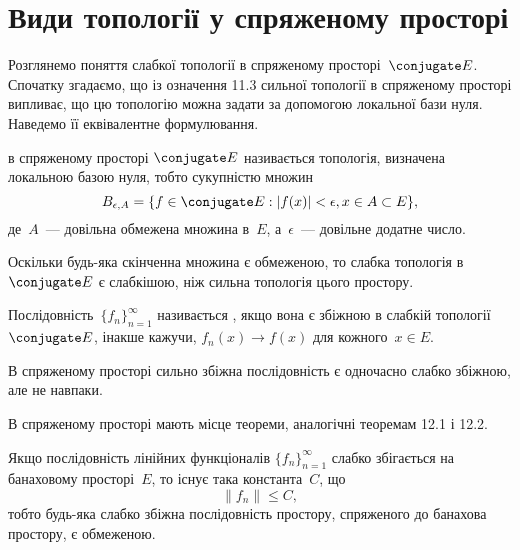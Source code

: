 \section{Види топології у спряженому просторі}

Розглянемо поняття слабкої топології в спряженому
просторі~$\conjugate E$. Спочатку згадаємо, що із означення 11.3 сильної
топології в спряженому просторі випливає, що цю топологію
можна задати за допомогою локальної бази нуля. Наведемо її
еквівалентне формулювання.

\begin{definition}
 в спряженому просторі
$\conjugate E$ називається топологія, визначена локальною базою нуля,
тобто сукупністю множин
\begin{equation*}
    B_{\epsilon, A} = \{ f \in \conjugate E: |f(x)| < \epsilon, x \in A \subset E\},
\end{equation*}
де~$A$~--- довільна обмежена множина в~$E$, а~$\epsilon$~--- довільне
додатне число.
\end{definition}

\begin{remark}
Оскільки будь-яка скінченна множина є
обмеженою, то слабка топологія в~$\conjugate E$ є слабкішою, ніж
сильна топологія цього простору.
\end{remark}

\begin{definition}
Послідовність~$\{f_n\}_{n = 1}^\infty$
називається ,
якщо вона є збіжною в слабкій топології~$\conjugate E$,
інакше кажучи, $f_n(x) \to f(x)$ для кожного~$x \in E$.
\end{definition}

\begin{remark}
В спряженому просторі сильно збіжна
послідовність є одночасно слабко збіжною, але не навпаки.
\end{remark}

В спряженому просторі мають місце теореми, аналогічні
теоремам 12.1 і 12.2.

\begin{theorem}
Якщо послідовність лінійних функціоналів
$\{f_n\}_{n = 1}^\infty$
слабко збігається на банаховому просторі~$E$, то
існує така константа~$C$, що
\begin{equation*}
    \|f_n\| \le C,
\end{equation*}
тобто будь-яка слабко збіжна послідовність простору,
спряженого до банахова простору, є обмеженою.
\end{theorem}

